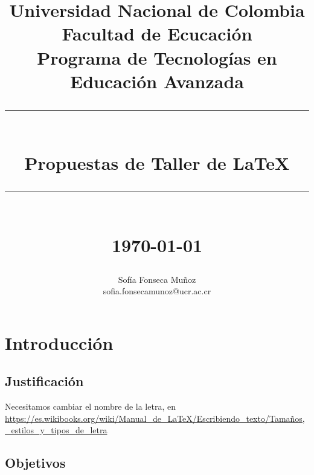 \documentclass[12pt]{report}
\newcommand{\HRule}[1]{\rule{\linewidth}{#1}}
\begin{document}
\title{ \normalsize Universidad Nacional de Colombia \\
		Facultad de Ecucación\\
		Programa de Tecnologías en Educación Avanzada
		\\ [2.0cm]
		\HRule{0.5pt} \\
		\LARGE \textbf{Propuestas de Taller de \LaTeX} %
		\HRule{2pt} \\ [0.5cm]
		\normalsize \today \vspace*{5\baselineskip}}

\date{}

\author{
		Sofía Fonseca Muñoz \\
		 sofia.fonsecamunoz@ucr.ac.cr}
\maketitle

\tableofcontents
\newpage



\chapter{Introducción}

\section{Justificación}
Necesitamos cambiar el nombre de la letra, en \url{https://es.wikibooks.org/wiki/Manual_de_LaTeX/Escribiendo_texto/Tamaños,_estilos_y_tipos_de_letra}

\section{Objetivos}
\end{document}
